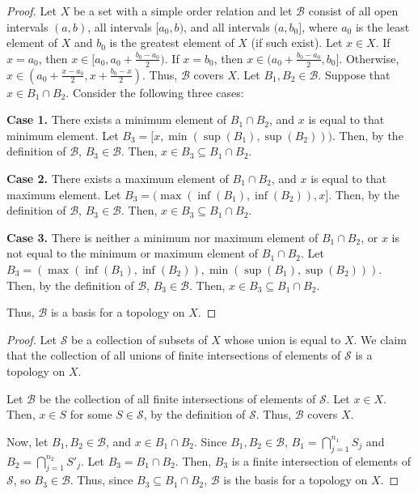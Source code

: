\documentclass{article}
\newcommand{\B}{\mathcal B}
\begin{document}
\newpage
{}
\begin{proof}
    Let $X$ be a set with a simple order relation and let $\B$ consist of all open intervals $(a,b)$, all intervals $[a_0,b)$, and all intervals $(a, b_0]$, where $a_0$ is the least element of $X$ and $b_0$ is the greatest element of $X$ (if such exist).
    Let $x \in X$.
    If $x = a_0$, then $x \in [a_0, a_0 + \frac{b_0 - a_0}2)$.
    If $x = b_0$, then $x \in (a_0 + \frac{b_0 - a_0}2, b_0]$.
    Otherwise, $x \in (a_0 + \frac{x - a_0}2, x + \frac{b_0 - x}2)$.
    Thus, $\B$ covers $X$.
    Let $B_1,B_2 \in \B$.
    Suppose that $x \in B_1 \cap B_2$.
    Consider the following three cases:

    {\bf Case 1.} There exists a minimum element of $B_1 \cap B_2$, and $x$ is equal to that minimum element.
    Let $B_3 = [x, \min(\sup(B_1), \sup(B_2)))$.
    Then, by the definition of $\B$, $B_3 \in \B$.
    Then, $x \in B_3 \subseteq B_1 \cap B_2$.

    {\bf Case 2.} There exists a maximum element of $B_1 \cap B_2$, and $x$ is equal to that maximum element.
    Let $B_3 = (\max(\inf(B_1), \inf(B_2)), x]$.
    Then, by the definition of $\B$, $B_3 \in \B$.
    Then, $x \in B_3 \subseteq B_1 \cap B_2$.

    {\bf Case 3.} There is neither a minimum nor maximum element of $B_1 \cap B_2$, or $x$ is not equal to the minimum or maximum element of $B_1 \cap B_2$.
    Let $B_3 = (\max(\inf(B_1), \inf(B_2)), \min(\sup(B_1), \sup(B_2)))$.
    Then, by the definition of $\B$, $B_3 \in \B$.
    Then, $x \in B_3 \subseteq B_1 \cap B_2$.

    Thus, $\B$ is a basis for a topology on $X$.
\end{proof}

\bigskip
{}
\begin{proof}
    Let $\mathcal S$ be a collection of subsets of $X$ whose union is equal to $X$.
    We claim that the collection of all unions of finite intersections of elements of $\mathcal S$ is a topology on $X$.

    Let $\mathcal B$ be the collection of all finite intersections of elements of $\mathcal S$.
    Let $x \in X$.
    Then, $x \in S$ for some $S \in \mathcal S$, by the definition of $\mathcal S$.
    Thus, $\mathcal B$ covers $X$.

    Now, let $B_1, B_2 \in \mathcal B$, and $x \in B_1 \cap B_2$.
    Since $B_1, B_2 \in \mathcal B$, $B_1 = \bigcap\limits_{j=1}^{n_1} S_j$ and $B_2 = \bigcap\limits_{j=1}^{n_2} S'_j$.
    Let $B_3 = B_1 \cap B_2$.
    Then, $B_3$ is a finite intersection of elements of $\mathcal S$, so $B_3 \in \B$.
    Thus, since $B_3 \subseteq B_1 \cap B_2$, $\B$ is the basis for a topology on $X$.
\end{proof}
\end{document}
